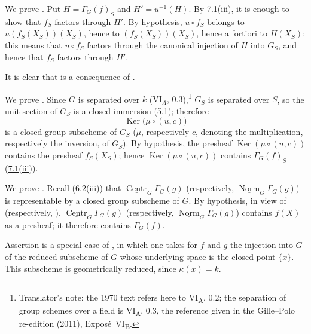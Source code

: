 We prove \textup{}. Put \(H=\Gamma_G(f)_S\) and
\(H'=u^{-1}(H)\). By \hyperref[concl:sga3-VIB-7.1-iii]{7.1\textup{(iii)}},
it is enough to show that \(f_S\) factors through \(H'\). By
hypothesis, \(u\circ f_S\) belongs to \(u(f_S(X_S))(X_S)\), hence
to \((f_S(X_S))(X_S)\), hence a fortiori to \(H(X_S)\); this means
that \(u\circ f_S\) factors through the canonical injection of
\(H\) into \(G_S\), and hence that \(f_S\) factors through \(H'\).

It is clear that \textup{} is a consequence of
\textup{}.

We prove \textup{}. Since \(G\) is separated over
\(k\) (\hyperref[sga3:VIA:0.3]{VI\(_A\), 0.3}),\footnote{Translator's note: the 1970 text refers here to
VI\textsubscript{A}, 0.2; the separation of group schemes over a field is VI\textsubscript{A}, 0.3, the
reference given in the Gille--Polo re-edition (2011), Exposé~VI\textsubscript{B}.} \(G_S\) is separated over \(S\), so the unit section
of \(G_S\) is a closed immersion (\hyperref[prop:sga3-VIB-5.1]{5.1}); therefore
\[
  \operatorname{Ker}\bigl(\mu\circ(u,c)\bigr)
\]
is a closed group subscheme of \(G_S\) (\(\mu\), respectively
\(c\), denoting the multiplication, respectively the inversion, of
\(G_S\)). By hypothesis, the presheaf
\(\operatorname{Ker}(\mu\circ(u,c))\) contains the presheaf
\(f_S(X_S)\); hence \(\operatorname{Ker}(\mu\circ(u,c))\) contains
\(\Gamma_G(f)_S\) (\hyperref[concl:sga3-VIB-7.1-iii]{7.1\textup{(iii)}}).

We prove \textup{}. Recall
(\hyperref[prop:sga3-VIB-6.2]{6.2\textup{(iii)}}) that
\(\underline{\operatorname{Centr}}_G\Gamma_G(g)\) (respectively,
\(\underline{\operatorname{Norm}}_G\Gamma_G(g)\)) is representable
by a closed group subscheme of \(G\). By hypothesis, in view of
\textup{} (respectively, \textup{}),
\(\underline{\operatorname{Centr}}_G\Gamma_G(g)\) (respectively,
\(\underline{\operatorname{Norm}}_G\Gamma_G(g)\)) contains \(f(X)\)
as a presheaf; it therefore contains \(\Gamma_G(f)\).

Assertion \textup{} is a special case of
\textup{}, in which one takes for \(f\) and \(g\)
the injection into \(G\) of the reduced subscheme of \(G\) whose
underlying space is the closed point \(\{x\}\). This subscheme is
geometrically reduced, since \(\kappa(x)=k\).

